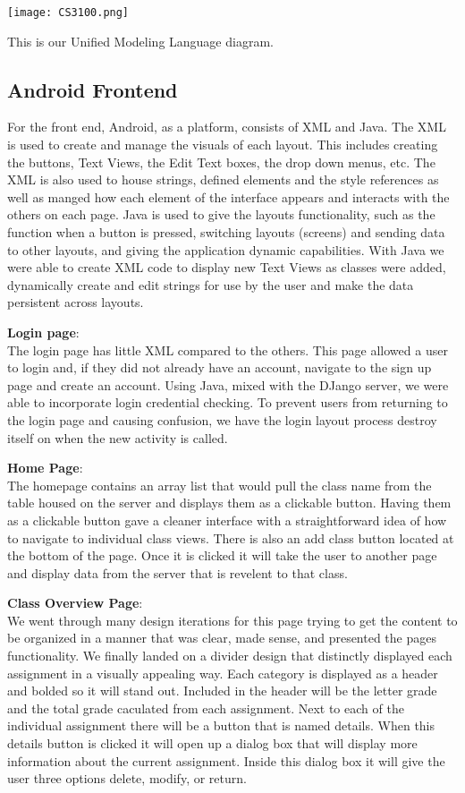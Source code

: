 \documentclass[a4paper]{article} %
\begin{document}
\centerline{\texttt{[image: CS3100.png]}}
This is our Unified Modeling Language diagram.

\subsection{Android Frontend}
For the front end, Android, as a platform, consists of XML and Java. The XML is used to create and manage the visuals of each layout. This includes creating the buttons, Text Views, the Edit Text boxes, the drop down menus, etc. The XML is also used to house strings, defined elements and the style references as well as manged how each element of the interface appears and interacts with the others on each page. Java is used to give the layouts functionality, such as the function when a button is pressed, switching layouts (screens) and sending data to other layouts, and giving the application dynamic capabilities. With Java we were able to create XML code to display new Text Views as classes were added, dynamically create and edit strings for use by the user and make the data persistent across layouts.

\textbf{Login page}:\\
The login page has little XML compared to the others. This page allowed a user to login and, if they did not already have an account, navigate to the sign up page and create an account. Using Java, mixed with the DJango server, we were able to incorporate login credential checking. To prevent users from returning to the login page and causing confusion, we have the login layout process destroy itself on when the new activity is called. 

\textbf{Home Page}:\\ 
The homepage contains an array list that would pull the class name from the table housed on the server and displays them as a clickable button. Having them as a clickable button gave a cleaner interface with a straightforward idea of how to navigate to individual class views. There is also an add class button located at the bottom of the page. Once it is clicked it will take the user to another page and display data from the server that is revelent to that class.

\textbf{Class Overview Page}:\\
We went through many design iterations for this page trying to get the content to be organized in a manner that was clear, made sense, and presented the pages functionality. We finally landed on a divider design that distinctly displayed each assignment in a visually appealing way. Each category is displayed as a header and bolded so it will stand out. Included in the header will be the letter grade and the total grade caculated from each assignment. Next to each of the individual assignment there will be a button that is named details. When this details button is clicked it will open up a dialog box that will display more information about the current assignment. Inside this dialog box it will give the user three options delete, modify, or return.
\end{document}
